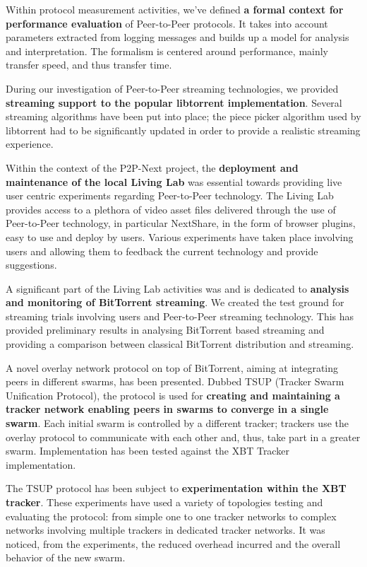 Within protocol measurement activities, we've defined \textbf{a formal context
for performance evaluation} of Peer-to-Peer protocols. It takes into account
parameters extracted from logging messages and builds up a model for analysis
and interpretation. The formalism is centered around performance, mainly
transfer speed, and thus transfer time.

During our investigation of Peer-to-Peer streaming technologies, we provided
\textbf{streaming support to the popular libtorrent implementation}. Several
streaming algorithms have been put into place; the piece picker algorithm
used by libtorrent had to be significantly updated in order to provide a
realistic streaming experience.

Within the context of the P2P-Next project, the \textbf{deployment and
maintenance of the local Living Lab} was essential towards providing live user
centric experiments regarding Peer-to-Peer technology. The Living Lab provides
access to a plethora of video asset files delivered through the use of
Peer-to-Peer technology, in particular NextShare, in the form of browser
plugins, easy to use and deploy by users. Various experiments have taken place
involving users and allowing them to feedback the current technology and
provide suggestions.

A significant part of the Living Lab activities was and is dedicated to
\textbf{analysis and monitoring of BitTorrent streaming}. We created the test
ground for streaming trials involving users and Peer-to-Peer streaming
technology. This has provided preliminary results in analysing BitTorrent
based streaming and providing a comparison between classical BitTorrent
distribution and streaming.

A novel overlay network protocol on top of BitTorrent, aiming at integrating
peers in different swarms, has been presented. Dubbed TSUP (Tracker Swarm
Unification Protocol), the protocol is used for \textbf{creating and
maintaining a tracker network enabling peers in swarms to converge in a single
swarm}. Each initial swarm is controlled by a different tracker; trackers use
the overlay protocol to communicate with each other and, thus, take part in a
greater swarm. Implementation has been tested against the XBT Tracker
implementation.

The TSUP protocol has been subject to \textbf{experimentation within the XBT
tracker}. These experiments have used a variety of topologies testing and
evaluating the protocol: from simple one to one tracker networks to complex
networks involving multiple trackers in dedicated tracker networks. It was
noticed, from the experiments, the reduced overhead incurred and the overall
behavior of the new swarm.

